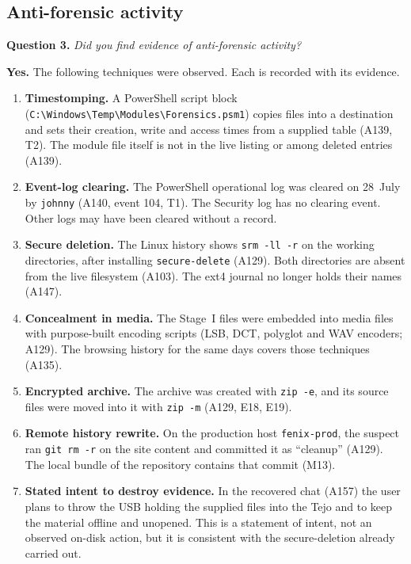 \documentclass[11pt,a4paper,final,oneside]{article}
\begin{document}
\subsection{Anti-forensic activity}
\label{sec:q3}

\textbf{Question 3.} \textit{Did you find evidence of anti-forensic activity?}

\textbf{Yes.} The following techniques were observed. Each is recorded with its evidence.

\begin{enumerate}
  \item \textbf{Timestomping.} A PowerShell script block (\texttt{C:\textbackslash{}Windows\textbackslash{}Temp\textbackslash{}Modules\textbackslash{}Forensics.psm1}) copies files into a destination and sets their creation, write and access times from a supplied table (A139, T2). The module file itself is not in the live listing or among deleted entries (A139).
  \item \textbf{Event-log clearing.} The PowerShell operational log was cleared on 28~July by \texttt{johnny} (A140, event 104, T1). The Security log has no clearing event. Other logs may have been cleared without a record.
  \item \textbf{Secure deletion.} The Linux history shows \texttt{srm -ll -r} on the working directories, after installing \texttt{secure-delete} (A129). Both directories are absent from the live filesystem (A103). The ext4 journal no longer holds their names (A147).
  \item \textbf{Concealment in media.} The Stage~I files were embedded into media files with purpose-built encoding scripts (LSB, DCT, polyglot and WAV encoders; A129). The browsing history for the same days covers those techniques (A135).
  \item \textbf{Encrypted archive.} The archive was created with \texttt{zip -e}, and its source files were moved into it with \texttt{zip -m} (A129, E18, E19).
  \item \textbf{Remote history rewrite.} On the production host \texttt{fenix-prod}, the suspect ran \texttt{git rm -r} on the site content and committed it as ``cleanup'' (A129). The local bundle of the repository contains that commit (M13).
  \item \textbf{Stated intent to destroy evidence.} In the recovered chat (A157) the user plans to throw the USB holding the supplied files into the Tejo and to keep the material offline and unopened. This is a statement of intent, not an observed on-disk action, but it is consistent with the secure-deletion already carried out.
\end{enumerate}
\end{document}
